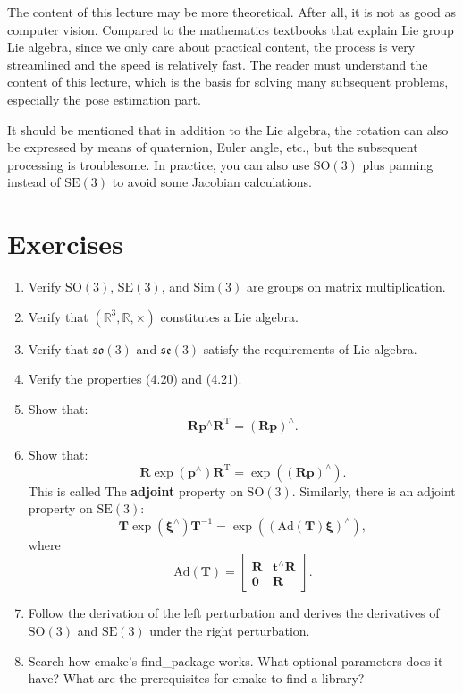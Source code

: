 The content of this lecture may be more theoretical. After all, it is not as good as computer vision. Compared to the mathematics textbooks that explain Lie group Lie algebra, since we only care about practical content, the process is very streamlined and the speed is relatively fast. The reader must understand the content of this lecture, which is the basis for solving many subsequent problems, especially the pose estimation part.

It should be mentioned that in addition to the Lie algebra, the rotation can also be expressed by means of quaternion, Euler angle, etc., but the subsequent processing is troublesome. In practice, you can also use $\mathrm{SO}(3)$ plus panning instead of $\mathrm{SE}(3)$ to avoid some Jacobian calculations.

\section*{Exercises}
\begin{enumerate}
    \item Verify $\mathrm{SO}(3)$, $\mathrm{SE}(3)$, and $\mathrm{Sim}(3)$ are groups on matrix multiplication.
    \item Verify that $( \mathbb{R}^3, \mathbb{R}, \times )$ constitutes a Lie algebra.
    \item Verify that $\mathfrak{so}(3)$ and $\mathfrak{se}(3)$ satisfy the requirements of Lie algebra.
    \item Verify the properties (4.20) and (4.21).
    \item Show that: \[
    \mathbf{R} \mathbf{p}^\wedge \mathbf{R}^\mathrm{T} = (\mathbf{Rp})^\wedge .\]
    \item Show that: \[
    \mathbf{R} \exp( \mathbf{p}^\wedge) \mathbf{R}^\mathrm{T} = \exp( (\mathbf{Rp})^\wedge ).\] This is called The \textbf{adjoint} property on $\mathrm{SO}(3)$. Similarly, there is an adjoint property on $\mathrm{SE}(3)$:
    \begin{equation}
    \mathbf{T} \exp(\boldsymbol{\xi}^\wedge)\mathbf{T}^{-1} = \exp \left( \left( \mathrm{Ad}(\mathbf{T}) \boldsymbol{\xi} \right) ^\wedge \right),
    \end{equation}
    where
    \begin{equation}
    \label{eq:adjSE3}
    \mathrm{Ad} ( \mathbf{T} ) = \left[ {\begin{array}{*{20}{c}}
        \mathbf{R} &{{ \mathbf{t} ^ \wedge } \mathbf{R} }\\
        \mathbf{0} & \mathbf{R}
        \end{array}} \right].
    \end{equation}
    \item Follow the derivation of the left perturbation and derives the derivatives of $\mathrm{SO}(3)$ and $\mathrm{SE}(3)$ under the right perturbation.
    \item Search how cmake's find\_package works. What optional parameters does it have? What are the prerequisites for cmake to find a library?
\end{enumerate}